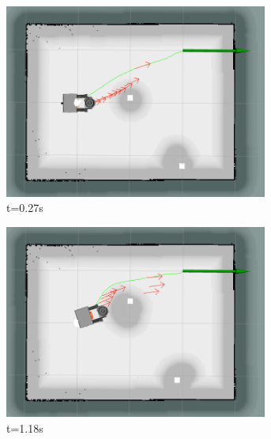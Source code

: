 \begin{figure}[H]
    \centering
    \begin{subfigure}[b]{0.35\linewidth}
        \centering
        \includegraphics[width=0.95\textwidth]{images/teb_single_2_obs/4/2527.png}
        \caption{t=0.27s}
    \end{subfigure}%
    \begin{subfigure}[b]{0.35\linewidth}
        \centering
        \includegraphics[width=0.95\textwidth]{images/teb_single_2_obs/4/2618.png}
        \caption{t=1.18s}
    \end{subfigure}%
    \begin{subfigure}[b]{0.35\linewidth}
        \centering

\end{subfigure}
\end{figure}
